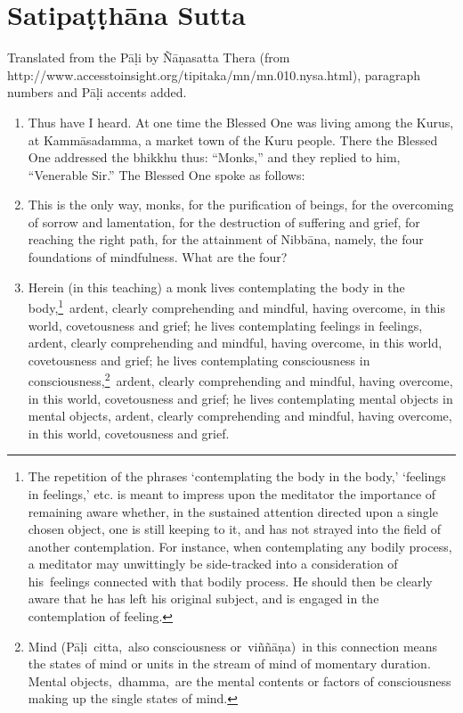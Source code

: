 \documentclass[a4 paper, 12pt]{article}
\begin{document}
\pagestyle{empty}

\section*{Satipaṭṭhāna Sutta}

Translated from the Pāḷi by Ñāṇasatta Thera (from http://www.accesstoinsight.org/tipitaka/mn/mn.010.nysa.html), paragraph numbers and Pāḷi accents added.

\begin{enumerate}
\item Thus have I heard. At one time the Blessed One was living among the Kurus, at Kammāsadamma, a market town of the Kuru people. There the Blessed One addressed the bhikkhu thus: ``Monks,'' and they replied to him, ``Venerable Sir.'' The Blessed One spoke as follows:
\item This is the only way, monks, for the purification of beings, for the overcoming of sorrow and lamentation, for the destruction of suffering and grief, for reaching the right path, for the attainment of Nibbāna, namely, the four foundations of mindfulness. What are the four?
\item Herein (in this teaching) a monk lives contemplating the body in the body,\footnote{The repetition of the phrases ‘contemplating the body in the body,’ ‘feelings in feelings,’ etc. is meant to impress upon the meditator the importance of remaining aware whether, in the sustained attention directed upon a single chosen object, one is still keeping to it, and has not strayed into the field of another contemplation. For instance, when contemplating any bodily process, a meditator may unwittingly be side-tracked into a consideration of his feelings connected with that bodily process. He should then be clearly aware that he has left his original subject, and is engaged in the contemplation of feeling.} ardent, clearly comprehending and mindful, having overcome, in this world, covetousness and grief; he lives contemplating feelings in feelings, ardent, clearly comprehending and mindful, having overcome, in this world, covetousness and grief; he lives contemplating consciousness in consciousness,\footnote{Mind (Pāḷi citta, also consciousness or viññāṇa) in this connection means the states of mind or units in the stream of mind of momentary duration. Mental objects, dhamma, are the mental contents or factors of consciousness making up the single states of mind.} ardent, clearly comprehending and mindful, having overcome, in this world, covetousness and grief; he lives contemplating mental objects in mental objects, ardent, clearly comprehending and mindful, having overcome, in this world, covetousness and grief.
\end{enumerate}
\end{document}
